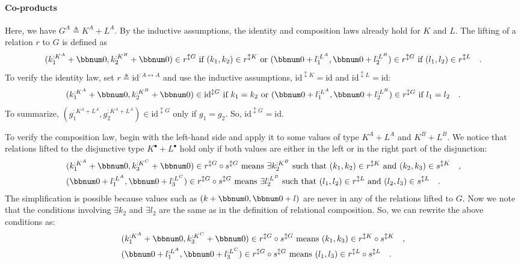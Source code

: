 \paragraph{Co-products}

Here, we have $G^{A}\triangleq K^{A}+L^{A}$. By the inductive assumptions,
the identity and composition laws already hold for $K$ and $L$.
The lifting of a relation $r$ to $G$ is defined as
\[
(k_{1}^{:K^{A}}+\bbnum 0,k_{2}^{:K^{B}}+\bbnum 0)\in r^{\updownarrow G}\text{ if }(k_{1},k_{2})\in r^{\updownarrow K}\text{ or }(\bbnum 0+l_{1}^{:L^{A}},\bbnum 0+l_{2}^{:L^{B}})\in r^{\updownarrow G}\text{ if }(l_{1},l_{2})\in r^{\updownarrow L}\quad.
\]
To verify the identity law, set $r\triangleq\text{id}^{:A\leftrightarrow A}$
and use the inductive assumptions, $\text{id}^{\updownarrow K}=\text{id}$
and $\text{id}^{\updownarrow L}=\text{id}$:
\[
(k_{1}^{:K^{A}}+\bbnum 0,k_{2}^{:K^{B}}+\bbnum 0)\in\text{id}^{\updownarrow G}\text{ if }k_{1}=k_{2}\text{ or }(\bbnum 0+l_{1}^{:L^{A}},\bbnum 0+l_{2}^{:L^{B}})\in r^{\updownarrow G}\text{ if }l_{1}=l_{2}\quad.
\]
To summarize, $(g_{1}^{:K^{A}+L^{A}},g_{2}^{:K^{A}+L^{A}})\in\text{id}^{\updownarrow G}$
only if $g_{1}=g_{2}$. So, $\text{id}^{\updownarrow G}=\text{id}$.

To verify the composition law, begin with the left-hand side and apply
it to some values of type $K^{A}+L^{A}$ and $K^{B}+L^{B}$. We notice
that relations lifted to the disjunctive type $K^{\bullet}+L^{\bullet}$
hold only if both values are either in the left or in the right part
of the disjunction:
\begin{align*}
 & (k_{1}^{:K^{A}}+\bbnum 0,k_{3}^{:K^{C}}+\bbnum 0)\in r^{\updownarrow G}\circ s^{\updownarrow G}\text{ means }\exists k_{2}^{:K^{B}}\text{ such that }(k_{1},k_{2})\in r^{\updownarrow K}\text{ and }(k_{2},k_{3})\in s^{\updownarrow K}\quad,\\
 & (\bbnum 0+l_{1}^{:L^{A}},\bbnum 0+l_{3}^{:L^{C}})\in r^{\updownarrow G}\circ s^{\updownarrow G}\text{ means }\exists l_{2}^{:L^{B}}\text{ such that }(l_{1},l_{2})\in r^{\updownarrow L}\text{ and }(l_{2},l_{3})\in s^{\updownarrow L}\quad.
\end{align*}
The simplification is possible because values such as $(k+\bbnum 0,\bbnum 0+l)$
are never in any of the relations lifted to $G$. Now we note that
the conditions involving $\exists k_{2}$ and $\exists l_{2}$ are
the same as in the definition of relational composition. So, we can
rewrite the above conditions as:
\begin{align*}
 & (k_{1}^{:K^{A}}+\bbnum 0,k_{3}^{:K^{C}}+\bbnum 0)\in r^{\updownarrow G}\circ s^{\updownarrow G}\text{ means }(k_{1},k_{3})\in r^{\updownarrow K}\circ s^{\updownarrow K}\quad,\\
 & (\bbnum 0+l_{1}^{:L^{A}},\bbnum 0+l_{3}^{:L^{C}})\in r^{\updownarrow G}\circ s^{\updownarrow G}\text{ means }(l_{1},l_{3})\in r^{\updownarrow L}\circ s^{\updownarrow L}\quad.
\end{align*}

